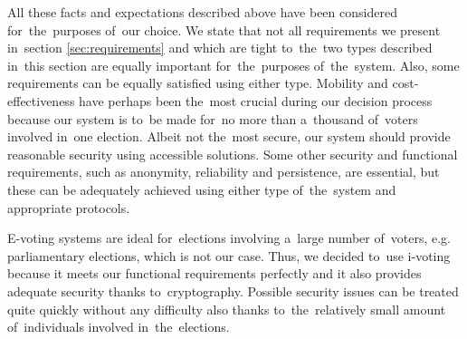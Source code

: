 All these facts and expectations described above have been considered for~the~purposes of~our choice. We state that not all requirements we present in~section \ref{sec:requirements} and which are tight to~the~two types described in~this section are equally important for~the~purposes of~the~system. Also, some requirements can be equally satisfied using either type. Mobility and cost-effectiveness have perhaps been the~most crucial during our decision process because our system is to~be made for~no more than a~thousand of~voters involved in~one election. Albeit not the~most secure, our system should provide reasonable security using accessible solutions. Some other security and functional requirements, such as anonymity, reliability and persistence, are essential, but these can be adequately achieved using either type of~the~system and appropriate protocols. 

E-voting systems are ideal for~elections involving a~large number of~voters, e.g. parliamentary elections, which is not our case. Thus, we decided to~use i-voting because it meets our functional requirements perfectly and it also provides adequate security thanks to~cryptography. Possible security issues can be treated quite quickly without any difficulty also thanks to~the~relatively small amount of~individuals involved in~the~elections.





